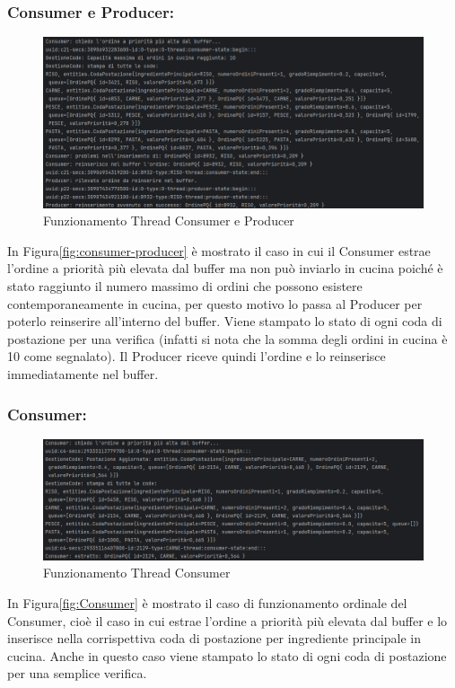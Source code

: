 \subsubsection{Consumer e Producer:}
\begin{figure}[H]
	\centering
	\includegraphics[scale=0.5]{iterazione3/images/consumer-producer.png}
	\caption{Funzionamento Thread Consumer e Producer \label{fig:consumer-producer}}
\end{figure}
In Figura\vref{fig:consumer-producer} è mostrato il caso in cui il Consumer estrae l'ordine a priorità più elevata dal buffer ma non può inviarlo in cucina poiché è stato raggiunto il numero massimo di ordini che possono esistere contemporaneamente in cucina, per questo motivo lo passa al Producer per poterlo reinserire all'interno del buffer. Viene stampato lo stato di ogni coda di postazione per una verifica (infatti si nota che la somma degli ordini in cucina è 10 come segnalato). Il Producer riceve quindi l'ordine e lo reinserisce immediatamente nel buffer.
\subsubsection{Consumer:}
\begin{figure}[H]
	\centering
	\includegraphics[scale=0.5]{iterazione3/images/Consumer.png}
	\caption{Funzionamento Thread Consumer \label{fig:Consumer}}
\end{figure}
In Figura\vref{fig:Consumer} è mostrato il caso di funzionamento ordinale del Consumer, cioè il caso in cui estrae l'ordine a priorità più elevata dal buffer e lo inserisce nella corrispettiva coda di postazione per ingrediente principale in cucina. Anche in questo caso viene stampato lo stato di ogni coda di postazione per una semplice verifica.
